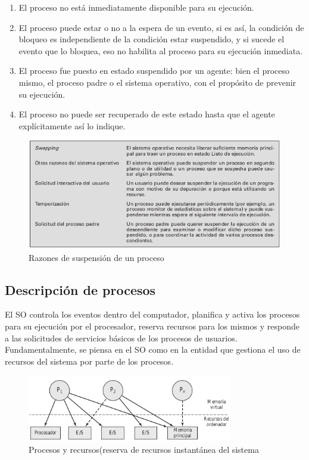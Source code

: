 \documentclass{article}
\begin{document}
				\begin{enumerate}
				\item El proceso no está inmediatamente disponible para su ejecución.
				\item El proceso puede estar o no a la espera de un evento, si es así, la condición de bloqueo es independiente de la condición estar suspendido, y si sucede el evento que lo bloquea, eso no habilita al proceso para su ejecución inmediata.
				\item El proceso fue puesto en estado suspendido por un agente: bien el proceso mismo, el proceso padre o el sistema operativo, con el propósito de prevenir su ejecución.
				\item El proceso no puede ser recuperado de este estado hasta que el agente explícitamente así lo indique.
				\end{enumerate}
				
				\begin{figure}
				\caption{Razones de suspensión de un proceso}
				\label{figura2.6:suspensión}
				\centering
				\includegraphics[width=1\textwidth, scale=1]{tema_2_figura6.png}
				\end{figure}
				
		\subsection{Descripción de procesos}
			El SO controla los eventos dentro del computador, planifica y activa los procesos para su ejecución por el procesador, reserva recursos para los mismos y responde a las solicitudes de servicios básicos de los procesos de usuarios. Fundamentalmente, se piensa en el SO como en la entidad que gestiona el uso de recursos del sistema por parte de los procesos. \\
			
			\begin{figure}
			\caption{Procesos y recursos(reserva de recursos instantánea del sistema}
			\label{figura2.7:procesosyrecurso}
			\centering
			\includegraphics[width=0.8\textwidth, scale=1]{tema_2_figura7.png}
			\end{figure}
			
\end{document}

